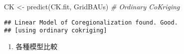 \documentclass[
]{book}
\newenvironment{Shaded}{\begin{snugshade}}{\end{snugshade}}
\newcommand{\CommentTok}[1]{\textcolor[rgb]{0.56,0.35,0.01}{\textit{#1}}}
\newcommand{\FunctionTok}[1]{\textcolor[rgb]{0.00,0.00,0.00}{#1}}
\newcommand{\NormalTok}[1]{#1}
\newcommand{\OtherTok}[1]{\textcolor[rgb]{0.56,0.35,0.01}{#1}}
\providecommand{\tightlist}{%
  \setlength{\itemsep}{0pt}\setlength{\parskip}{0pt}}
\begin{document}
\begin{Shaded}
\begin{Highlighting}[]
\NormalTok{CK }\OtherTok{\textless{}{-}} \FunctionTok{predict}\NormalTok{(CK.fit, GridBAUs) }\CommentTok{\# Ordinary CoKriging}
\end{Highlighting}
\end{Shaded}

\begin{verbatim}
## Linear Model of Coregionalization found. Good.
## [using ordinary cokriging]
\end{verbatim}

\begin{enumerate}
\def\labelenumi{\arabic{enumi}.}
\setcounter{enumi}{4}
\tightlist
\item
  各種模型比較
\end{enumerate}
\end{document}
